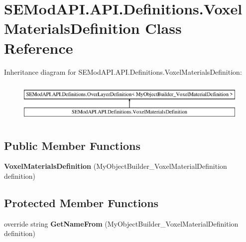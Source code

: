 \hypertarget{class_s_e_mod_a_p_i_1_1_a_p_i_1_1_definitions_1_1_voxel_materials_definition}{}\section{S\+E\+Mod\+A\+P\+I.\+A\+P\+I.\+Definitions.\+Voxel\+Materials\+Definition Class Reference}
\label{class_s_e_mod_a_p_i_1_1_a_p_i_1_1_definitions_1_1_voxel_materials_definition}
Inheritance diagram for S\+E\+Mod\+A\+P\+I.\+A\+P\+I.\+Definitions.\+Voxel\+Materials\+Definition\+:\begin{figure}[H]
\begin{center}
\leavevmode
\includegraphics[height=2.000000cm]{class_s_e_mod_a_p_i_1_1_a_p_i_1_1_definitions_1_1_voxel_materials_definition}
\end{center}
\end{figure}
\subsection*{Public Member Functions}
\begin{DoxyCompactItemize}
\item 
\hypertarget{class_s_e_mod_a_p_i_1_1_a_p_i_1_1_definitions_1_1_voxel_materials_definition_a1dea3e91d9b9fa7f9bf795c53bcaa298}{}{\bfseries Voxel\+Materials\+Definition} (My\+Object\+Builder\+\_\+\+Voxel\+Material\+Definition definition)\label{class_s_e_mod_a_p_i_1_1_a_p_i_1_1_definitions_1_1_voxel_materials_definition_a1dea3e91d9b9fa7f9bf795c53bcaa298}

\end{DoxyCompactItemize}
\subsection*{Protected Member Functions}
\begin{DoxyCompactItemize}
\item 
\hypertarget{class_s_e_mod_a_p_i_1_1_a_p_i_1_1_definitions_1_1_voxel_materials_definition_ae8d9eee872a3a6f3d9771bb06aa42b7d}{}override string {\bfseries Get\+Name\+From} (My\+Object\+Builder\+\_\+\+Voxel\+Material\+Definition definition)\label{class_s_e_mod_a_p_i_1_1_a_p_i_1_1_definitions_1_1_voxel_materials_definition_ae8d9eee872a3a6f3d9771bb06aa42b7d}

\end{DoxyCompactItemize}
